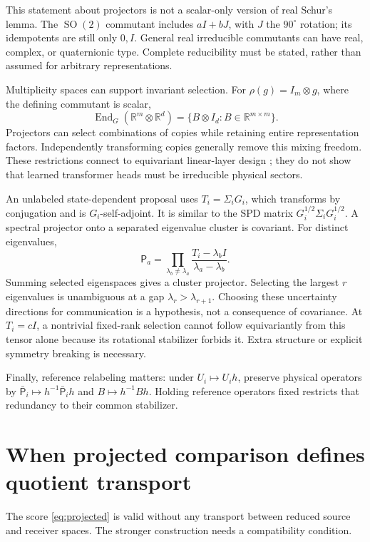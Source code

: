 \documentclass[11pt,letterpaper]{article}
\newcommand{\R}{\mathbb R}
\newcommand{\SO}{\operatorname{SO}}
\theoremstyle{remark}
\begin{document}
This statement about projectors is not a scalar-only version of real Schur's lemma. The $\SO(2)$ commutant includes $aI+bJ$, with $J$ the $90^\circ$ rotation; its idempotents are still only $0,I$. General real irreducible commutants can have real, complex, or quaternionic type. Complete reducibility must be stated, rather than assumed for arbitrary representations.

Multiplicity spaces can support invariant selection. For $\rho(g)=I_m\otimes g$, where the defining commutant is scalar,
\begin{equation}
 \operatorname{End}_{G}(\R^m\otimes\R^d)
 =\{B\otimes I_d:B\in\R^{m\times m}\}.
\end{equation}
Projectors can select combinations of copies while retaining entire representation factors. Independently transforming copies generally remove this mixing freedom. These restrictions connect to equivariant linear-layer design \cite{Finzi2021}; they do not show that learned transformer heads must be irreducible physical sectors.

An unlabeled state-dependent proposal uses $T_i=\Sigma_iG_i$, which transforms by conjugation and is $G_i$-self-adjoint. It is similar to the SPD matrix $G_i^{1/2}\Sigma_iG_i^{1/2}$. A spectral projector onto a separated eigenvalue cluster is covariant. For distinct eigenvalues,
\begin{equation}
 \mathsf P_a=\prod_{\lambda_b\ne\lambda_a}
 \frac{T_i-\lambda_bI}{\lambda_a-\lambda_b}.
\end{equation}
Summing selected eigenspaces gives a cluster projector. Selecting the largest $r$ eigenvalues is unambiguous at a gap $\lambda_r>\lambda_{r+1}$. Choosing these uncertainty directions for communication is a hypothesis, not a consequence of covariance. At $T_i=cI$, a nontrivial fixed-rank selection cannot follow equivariantly from this tensor alone because its rotational stabilizer forbids it. Extra structure or explicit symmetry breaking is necessary.

Finally, reference relabeling matters: under $U_i\mapsto U_ih$, preserve physical operators by $\bar{\mathsf P}_i\mapsto h^{-1}\bar{\mathsf P}_ih$ and $B\mapsto h^{-1}Bh$. Holding reference operators fixed restricts that redundancy to their common stabilizer.

\section{When projected comparison defines quotient transport}
\label{sec:quotient}
The score \eqref{eq:projected} is valid without any transport between reduced source and receiver spaces. The stronger construction needs a compatibility condition.
\end{document}
